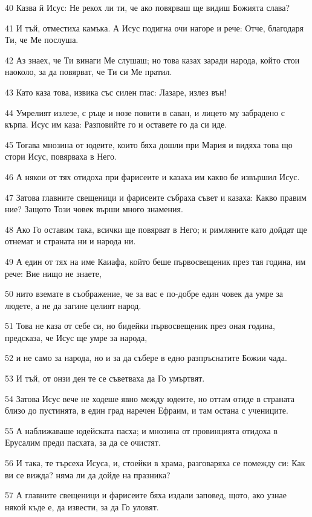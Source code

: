 \par 40 Казва й Исус: Не рекох ли ти, че ако повярваш ще видиш Божията слава?
\par 41 И тъй, отместиха камъка. А Исус подигна очи нагоре и рече: Отче, благодаря Ти, че Ме послуша.
\par 42 Аз знаех, че Ти винаги Ме слушаш; но това казах заради народа, който стои наоколо, за да повярват, че Ти си Ме пратил.
\par 43 Като каза това, извика със силен глас: Лазаре, излез вън!
\par 44 Умрелият излезе, с ръце и нозе повити в саван, и лицето му забрадено с кърпа. Исус им каза: Разповийте го и оставете го да си иде.
\par 45 Тогава мнозина от юдеите, които бяха дошли при Мария и видяха това що стори Исус, повярваха в Него.
\par 46 А някои от тях отидоха при фарисеите и казаха им какво бе извършил Исус.
\par 47 Затова главните свещеници и фарисеите събраха съвет и казаха: Какво правим ние? Защото Този човек върши много знамения.
\par 48 Ако Го оставим така, всички ще повярват в Него; и римляните като дойдат ще отнемат и страната ни и народа ни.
\par 49 А един от тях на име Каиафа, който беше първосвещеник през тая година, им рече: Вие нищо не знаете,
\par 50 нито вземате в съображение, че за вас е по-добре един човек да умре за людете, а не да загине целият народ.
\par 51 Това не каза от себе си, но бидейки първосвещеник през оная година, предсказа, че Исус ще умре за народа,
\par 52 и не само за народа, но и за да събере в едно разпръснатите Божии чада.
\par 53 И тъй, от онзи ден те се съветваха да Го умъртвят.
\par 54 Затова Исус вече не ходеше явно между юдеите, но оттам отиде в страната близо до пустинята, в един град наречен Ефраим, и там остана с учениците.
\par 55 А наближаваше юдейската пасха; и мнозина от провинцията отидоха в Ерусалим преди пасхата, за да се очистят.
\par 56 И така, те търсеха Исуса, и, стоейки в храма, разговаряха се помежду си: Как ви се вижда? няма ли да дойде на празника?
\par 57 А главните свещеници и фарисеите бяха издали заповед, щото, ако узнае някой къде е, да извести, за да Го уловят.

